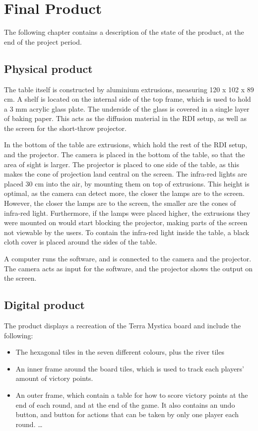\chapter{Final Product}\label{ch:finproduct}
The following chapter contains a description of the state of the product, at the end of the project period.

\section{Physical product}
The table itself is constructed by aluminium extrusions, measuring 120 x 102 x 89 cm. A shelf is located on the internal side of the top frame, which is used to hold a 3 mm acrylic glass plate. The underside of the glass is covered in a single layer of baking paper. This acts as the diffusion material in the RDI setup, as well as the screen for the short-throw projector.

In the bottom of the table are extrusions, which hold the rest of the RDI setup, and the projector. The camera is placed in the bottom of the table, so that the area of sight is larger. The projector is placed to one side of the table, as this makes the cone of projection land central on the screen. The infra-red lights are placed 30 cm into the air, by mounting them on top of extrusions. This height is optimal, as the camera can detect more, the closer the lamps are to the screen. However, the closer the lamps are to the screen, the smaller are the cones of infra-red light.  Furthermore, if the lamps were placed higher, the extrusions they were mounted on would start blocking the projector, making parts of the screen not viewable by the users. To contain the infra-red light inside the table, a black cloth cover is placed around the sides of the table.

A computer runs the software, and is connected to the camera and the projector. The camera acts as input for the software, and the projector shows the output on the screen.

\section{Digital product}
The product displays a recreation of the Terra Mystica board and include the following:
\begin{itemize}
	\item The hexagonal tiles in the seven different colours, plus the river tiles
	\item An inner frame around the board tiles, which is used to track each players' amount of victory points.
	\item An outer frame, which contain a table for how to score victory points at the end of each round, and at the end of the game. It also contains an undo button, and button for actions that can be taken by only one player each round.
	\ldots
\end{itemize}



